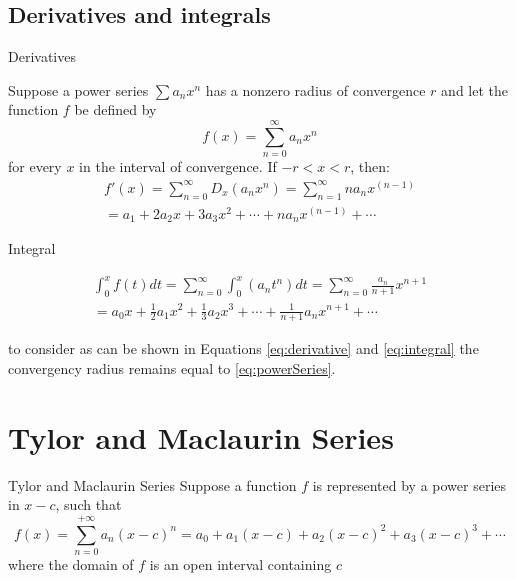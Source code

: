 \documentclass[newPxFont]{beamer}
\begin{document}
\subsection{Derivatives and integrals}
\begin{frame}{Derivatives}
  \begin{theorem}
    Suppose a power series $\sum a_nx^n$ has a nonzero radius of convergence $r$ and let the function $f$ be defined by
    \begin{equation}
      f(x)=\sum_{n=0}^{\infty}a_nx^n\label{eq:powerSeries}
    \end{equation}
for every $x$ in the interval of convergence. If $-r<x<r$, then:
    \begin{eqnarray}
      f'(x)=\sum_{n=0}^{\infty}D_x(a_nx^n)=\sum_{n=1}^\infty na_nx^{(n-1)}\label{eq:derivative}\\\nonumber
      =a_1+2a_2x+3a_3x^2+\cdots+na_nx^{(n-1)}+\cdots
    \end{eqnarray}
  \end{theorem}
\end{frame}
\begin{frame}{Integral}
\begin{theorem}
\begin{eqnarray}
  \int_0^x f(t)dt=\sum_{n=0}^{\infty}\int_0^x (a_nt^n)dt=\sum_{n=0}^\infty \frac{a_n}{n+1}x^{n+1}\label{eq:integral}\\\nonumber
  =a_0x+\frac{1}{2}a_1x^2+\frac{1}{3}a_2x^3+\cdots+\frac{1}{n+1}a_nx^{n+1}+\cdots
\end{eqnarray}
\end{theorem}
  \begin{alertblock}{to consider}
    as can be shown in Equations \eqref{eq:derivative} and \eqref{eq:integral} the convergency radius remains equal to \eqref{eq:powerSeries}.
  \end{alertblock}
\end{frame}
\section{Tylor and Maclaurin Series}
\begin{frame}{Tylor and Maclaurin Series}
  Suppose a function $f$ is represented by a power series in $x-c$, such that
  \begin{equation}
    f(x)=\sum_{n=0}^{+\infty}a_n (x-c)^n=a_0+a_1(x-c)+a_2(x-c)^2+a_3(x-c)^3+\cdots
  \end{equation}
where the domain of $f$ is an open interval containing $c$
\end{frame}
\end{document}
